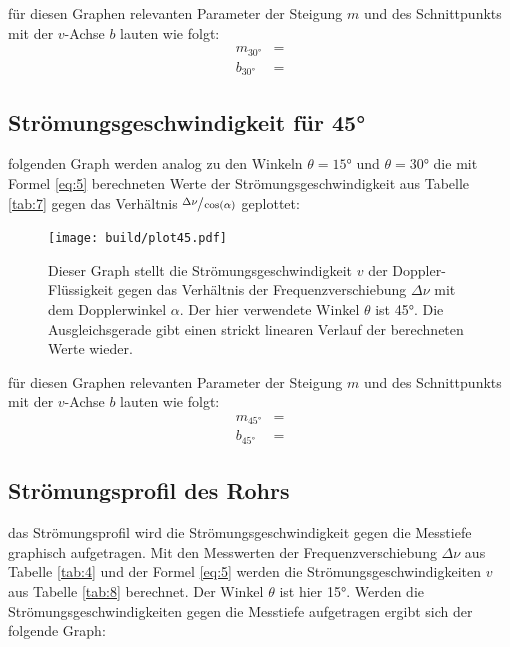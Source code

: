     \justifying für diesen Graphen relevanten Parameter der Steigung $m$ und des Schnittpunkts mit der $v$-Achse $b$ lauten wie folgt:
    \begin{align}
        m_{30°} &= \text{} \label{eq:8}\\
        b_{30°} &= \text{} \label{eq:9}
    \end{align}

\newpage
\subsection{Strömungsgeschwindigkeit für 45°}

    \justifying folgenden Graph werden analog zu den Winkeln $\theta=15°$ und $\theta=30°$ die mit Formel \eqref{eq:5} berechneten Werte der Strömungsgeschwindigkeit 
    aus Tabelle \ref{tab:7} gegen das Verhältnis $\sfrac{\Delta\nu}{\cos(\alpha)}$ geplottet:

\begin{figure}[H]
    \centering
    \texttt{[image: build/plot45.pdf]}
    \caption{Dieser Graph stellt die Strömungsgeschwindigkeit $v$ der Doppler-Flüssigkeit gegen das Verhältnis der Frequenzverschiebung $\Delta\nu$ mit dem Dopplerwinkel $\alpha$. 
    Der hier verwendete Winkel $\theta$ ist 45°. Die Ausgleichsgerade gibt einen strickt linearen Verlauf der berechneten Werte wieder.}
    \label{fig:7}
\end{figure}

    \justifying für diesen Graphen relevanten Parameter der Steigung $m$ und des Schnittpunkts mit der $v$-Achse $b$ lauten wie folgt:
    \begin{align}
        m_{45°} &= \text{} \label{eq:10}\\
        b_{45°} &= \text{} \label{eq:11}
    \end{align}

\newpage
\subsection{Strömungsprofil des Rohrs}

    \justifying das Strömungsprofil wird die Strömungsgeschwindigkeit gegen die Messtiefe graphisch aufgetragen. Mit den Messwerten der Frequenzverschiebung
    $\Delta\nu$ aus Tabelle \ref{tab:4} und der Formel \eqref{eq:5} werden die Strömungsgeschwindigkeiten $v$ aus Tabelle \ref{tab:8} berechnet. Der Winkel $\theta$ ist hier
    15°. Werden die Strömungsgeschwindigkeiten gegen die Messtiefe aufgetragen ergibt sich der folgende Graph:

